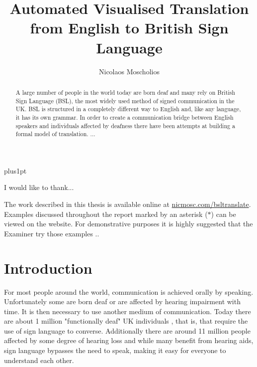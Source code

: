 \documentclass[12pt]{ociamthesis}  %
\title{Automated Visualised Translation from English to British Sign Language}
\author{Nicolaos Moscholios}             %
\begin{document}
\baselineskip=18pt plus1pt

\maketitle                  %

\begin{abstract}
A large number of people in the world today are born deaf and many rely on British Sign Language (BSL), the most widely used method of signed communication in the UK. BSL is structured in a completely different way to English and, like any language, it has its own grammar. In order to create a communication bridge between English speakers and individuals affected by deafness there have been attempts at building a formal model of translation. ...
\end{abstract}

\begin{acknowledgements}
I would like to thank...
\end{acknowledgements}

\begin{notes}
The work described in this thesis is available online at \url{nicmosc.com/bsltranslate}. Examples discussed throughout the report marked by an asterisk ($\ast$) can be viewed on the website. For demonstrative purposes it is highly suggested that the Examiner try those examples ..
\end{notes}

{\pagestyle{plain}
	\begin{romanpages}          %
	\setcounter{tocdepth}{5}
	\setcounter{secnumdepth}{5}
	\tableofcontents            %
	\listoffigures              %
	\listoftables
	\end{romanpages}            %
\cleardoublepage}


\chapter{Introduction}
For most people around the world, communication is achieved orally by speaking. Unfortunately some are born deaf or are affected by hearing impairment with time. It is then necessary to use another medium of communication. Today there are about 1 million "functionally deaf" UK individuals , that is, that require the use of sign language to converse. Additionally there are around 11 million people affected by some degree of hearing loss and while many benefit from hearing aids, sign language bypasses the need to speak, making it easy for everyone to understand each other.  
\end{document}
